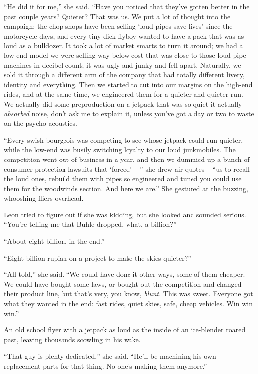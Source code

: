 “He did it for me,” she said. “Have you noticed that they've 
gotten better in the past couple years? Quieter? That was us. We put a 
lot of thought into the campaign; the chop-shops have been selling 
`loud pipes save lives' since the motorcycle days, and every tiny-dick 
flyboy wanted to have a pack that was as loud as a bulldozer. It took a 
lot of market smarts to turn it around; we had a low-end model we were 
selling way below cost that was close to those loud-pipe machines in 
decibel count; it was ugly and junky and fell apart. Naturally, we sold 
it through a different arm of the company that had totally different 
livery, identity and everything. Then we started to cut into our 
margins on the high-end rides, and at the same time, we engineered them 
for a quieter and quieter run. We actually did some preproduction on a 
jetpack that was so quiet it actually \emph{absorbed} noise, don't ask 
me to explain it, unless you've got a day or two to waste on the 
psycho-acoustics.

“Every swish bourgeois was competing to see whose jetpack could run 
quieter, while the low-end was busily switching loyalty to our loud 
junkmobiles. The competition went out of business in a year, and then 
we dummied-up a bunch of consumer-protection lawsuits that `forced' -- 
” she drew air-quotes -- “us to recall the loud ones, rebuild them 
with pipes so engineered and tuned you could use them for the woodwinds 
section. And here we are.” She gestured at the buzzing, whooshing 
fliers overhead.

Leon tried to figure out if she was kidding, but she looked and sounded 
serious. “You're telling me that Buhle dropped, what, a billion?”

“About eight billion, in the end.”

“Eight billion rupiah on a project to make the skies quieter?”

“All told,” she said. “We could have done it other ways, some of 
them cheaper. We could have bought some laws, or bought out the 
competition and changed their product line, but that's very, you know, 
\emph{blunt}. This was sweet. Everyone got what they wanted in the end: 
fast rides, quiet skies, safe, cheap vehicles. Win win win.”

An old school flyer with a jetpack as loud as the inside of an 
ice-blender roared past, leaving thousands scowling in his wake.

“That guy is plenty dedicated,” she said. “He'll be machining his 
own replacement parts for that thing. No one's making them anymore.”

